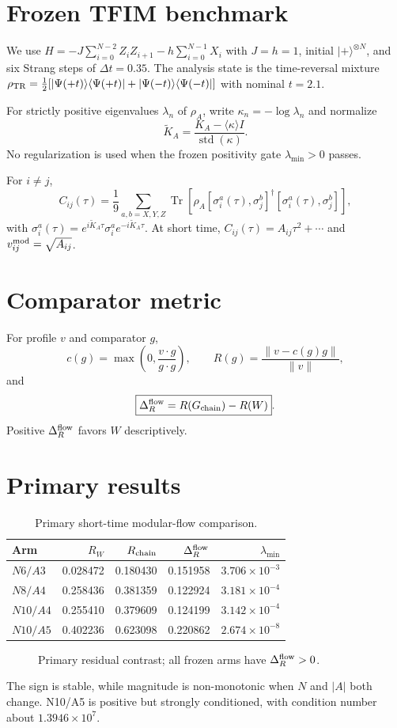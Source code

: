 \documentclass[11pt,a4paper]{article}
\newcommand{\Tr}{\operatorname{Tr}}\newcommand{\Lent}{L_{\rm ent}}\newcommand{\DR}{\Delta_R^{\rm flow}}
\begin{document}
\section{Frozen TFIM benchmark}
We use $H=-J\sum_{i=0}^{N-2}Z_iZ_{i+1}-h\sum_{i=0}^{N-1}X_i$ with $J=h=1$, initial $|+\rangle^{\otimes N}$, and six Strang steps of $\Delta t=0.35$. The analysis state is the time-reversal mixture $\rho_{\rm TR}=\tfrac12[|\Psi(+t)\rangle\langle\Psi(+t)|+|\Psi(-t)\rangle\langle\Psi(-t)|]$ with nominal $t=2.1$.

For strictly positive eigenvalues $\lambda_n$ of $\rho_A$, write $\kappa_n=-\log\lambda_n$ and normalize
\[
\widetilde K_A=\frac{K_A-\langle\kappa\rangle I}{\operatorname{std}(\kappa)}.
\]
No regularization is used when the frozen positivity gate $\lambda_{\min}>0$ passes.

For $i\ne j$,
\[
C_{ij}(\tau)=\frac19\sum_{a,b=X,Y,Z}\Tr\!\left[\rho_A[\sigma_i^a(\tau),\sigma_j^b]^\dagger[\sigma_i^a(\tau),\sigma_j^b]\right],
\]
with $\sigma_i^a(\tau)=e^{i\widetilde K_A\tau}\sigma_i^ae^{-i\widetilde K_A\tau}$. At short time, $C_{ij}(\tau)=A_{ij}\tau^2+\cdots$ and $v_{ij}^{\rm mod}=\sqrt{A_{ij}}$.
\section{Comparator metric}
For profile $v$ and comparator $g$,
\[
c(g)=\max\!\left(0,\frac{v\cdot g}{g\cdot g}\right),\qquad R(g)=\frac{\|v-c(g)g\|}{\|v\|},
\]
and
\[
\boxed{\DR=R(G_{\rm chain})-R(W)}.
\]
Positive $\DR$ favors $W$ descriptively.
\section{Primary results}
\begin{table}[ht]\centering\caption{Primary short-time modular-flow comparison.}\begin{tabular}{lrrrr}\toprule Arm & $R_W$ & $R_{\rm chain}$ & $\DR$ & $\lambda_{\min}$\\\midrule
$N6/A3$&0.028472&0.180430&0.151958&$3.706\times10^{-3}$\\
$N8/A4$&0.258436&0.381359&0.122924&$3.181\times10^{-4}$\\
$N10/A4$&0.255410&0.379609&0.124199&$3.142\times10^{-4}$\\
$N10/A5$&0.402236&0.623098&0.220862&$2.674\times10^{-8}$\\\bottomrule\end{tabular}\end{table}
\begin{figure}[ht]\centering\caption{Primary residual contrast; all frozen arms have $\DR>0$.}\end{figure}
The sign is stable, while magnitude is non-monotonic when $N$ and $|A|$ both change. N10/A5 is positive but strongly conditioned, with condition number about $1.3946\times10^7$.
\end{document}
